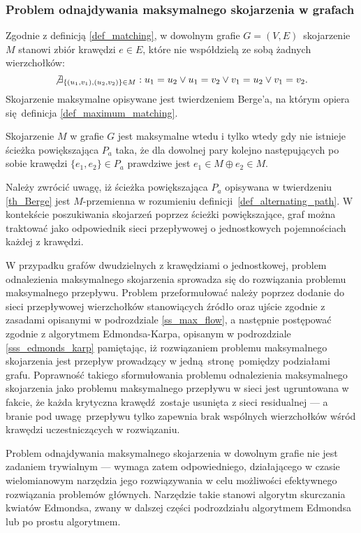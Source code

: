 \subsubsection{\textbf{Problem odnajdywania maksymalnego skojarzenia w grafach}}
\par{
  Zgodnie z definicją \ref{def_matching}, w dowolnym grafie $G=(V,E)$~skojarzenie $M$ stanowi zbiór krawędzi $e \in E$, które nie współdzielą ze sobą żadnych wierzchołków: \[\not\exists_{\{(u_1,v_1), (u_2, v_2)\} \in M}:{u_1 = u_2 \lor u_1 = v_2 \lor v_1 = u_2 \lor v_1 = v_2}.\]
  Skojarzenie maksymalne opisywane jest twierdzeniem Berge'a, na którym opiera się definicja \ref{def_maximum_matching}.
  \begin{theorem}
    Skojarzenie $M$ w grafie $G$ jest maksymalne wtedu i tylko wtedy gdy nie istnieje ścieżka powiększająca $P_a$ taka, że dla dowolnej pary kolejno następujących po sobie krawędzi $\{e_1, e_2\} \in P_a$ prawdziwe jest $e_1 \in M \oplus e_2 \in M$.
  \end{theorem}
   Należy zwrócić uwagę, iż ścieżka powiększająca $P_a$ opisywana w twierdzeniu \ref{th_Berge} jest $M$-przemienna w rozumieniu definicji~\ref{def_alternating_path}.
   W kontekście poszukiwania skojarzeń poprzez ścieżki powiększające, graf można traktować jako odpowiednik sieci przepływowej o jednostkowych pojemnościach każdej z krawędzi.
}
\par{
  W przypadku grafów dwudzielnych z krawędziami o jednostkowej, problem odnalezienia maksymalnego skojarzenia sprowadza się do rozwiązania problemu maksymalnego przepływu.
  Problem przeformułować należy poprzez dodanie do sieci przepływowej wierzchołków stanowiących źródło oraz ujście zgodnie z zasadami opisanymi w podrozdziale \ref{ss_max_flow}, a następnie postępować zgodnie z algorytmem Edmondsa-Karpa, opisanym w podrozdziale \ref{sss_edmonds_karp} pamiętając, iż rozwiązaniem problemu maksymalnego skojarzenia jest przepływ prowadzący w jedną stronę pomiędzy podziałami grafu.
  Poprawność takiego sformułowania problemu odnalezienia maksymalnego skojarzenia jako problemu maksymalnego przepływu w sieci jest ugruntowana w fakcie, że każda krytyczna krawędź zostaje usunięta z sieci residualnej --- a branie pod uwagę przepływu tylko zapewnia brak wspólnych wierzchołków wśród krawędzi uczestniczących w rozwiązaniu.
}
\par{
  Problem odnajdywania maksymalnego skojarzenia w dowolnym grafie nie jest zadaniem trywialnym --- wymaga zatem odpowiedniego, działającego w czasie wielomianowym narzędzia jego rozwiązywania w celu możliwości efektywnego rozwiązania problemów głównych.
  Narzędzie takie stanowi algorytm skurczania kwiatów Edmondsa, zwany w dalszej części podrozdziału algorytmem Edmondsa lub po prostu algorytmem.
}
